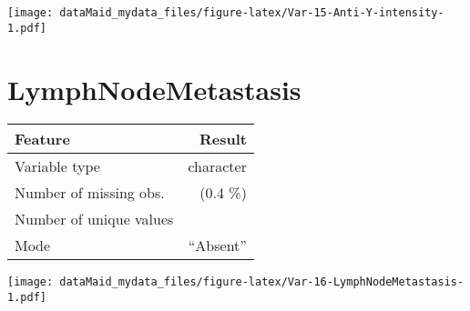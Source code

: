 \documentclass[]{report}
\begin{document}
\begin{minipage}{0.25 \textwidth}

\texttt{[image: dataMaid\_mydata\_files/figure-latex/Var-15-Anti-Y-intensity-1.pdf]}

\end{minipage}

\noindent\makebox[\linewidth]{\rule{\textwidth}{0.4pt}}

\hypertarget{lymphnodemetastasis}{%
\section{LymphNodeMetastasis}\label{lymphnodemetastasis}}

\begin{minipage}{0.75 \textwidth}

\begin{longtable}[]{@{}lr@{}}
\toprule
\begin{minipage}[b]{0.34\columnwidth}\raggedright
Feature\strut
\end{minipage} & \begin{minipage}[b]{0.16\columnwidth}\raggedleft
Result\strut
\end{minipage}\tabularnewline
\midrule
\endhead
\begin{minipage}[t]{0.34\columnwidth}\raggedright
Variable type\strut
\end{minipage} & \begin{minipage}[t]{0.16\columnwidth}\raggedleft
character\strut
\end{minipage}\tabularnewline
\begin{minipage}[t]{0.34\columnwidth}\raggedright
Number of missing obs.\strut
\end{minipage} & \begin{minipage}[t]{0.16\columnwidth}\raggedleft
1 (0.4 \%)\strut
\end{minipage}\tabularnewline
\begin{minipage}[t]{0.34\columnwidth}\raggedright
Number of unique values\strut
\end{minipage} & \begin{minipage}[t]{0.16\columnwidth}\raggedleft
2\strut
\end{minipage}\tabularnewline
\begin{minipage}[t]{0.34\columnwidth}\raggedright
Mode\strut
\end{minipage} & \begin{minipage}[t]{0.16\columnwidth}\raggedleft
``Absent''\strut
\end{minipage}\tabularnewline
\bottomrule
\end{longtable}

\end{minipage}
\begin{minipage}{0.25 \textwidth}

\texttt{[image: dataMaid\_mydata\_files/figure-latex/Var-16-LymphNodeMetastasis-1.pdf]}

\end{minipage}
\end{document}
